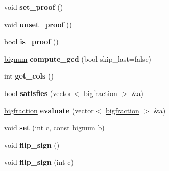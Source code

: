 \begin{DoxyCompactItemize}
\item 
\hypertarget{classEquation_a89987ec22fd6d12148217149076b42bc}{void {\bfseries set\-\_\-proof} ()}\label{classEquation_a89987ec22fd6d12148217149076b42bc}

\item 
\hypertarget{classEquation_af9da212e3e0d5da196c7ae3c981ee925}{void {\bfseries unset\-\_\-proof} ()}\label{classEquation_af9da212e3e0d5da196c7ae3c981ee925}

\item 
\hypertarget{classEquation_a8d8fd4ab3a72786ffbc0bf07153362ca}{bool {\bfseries is\-\_\-proof} ()}\label{classEquation_a8d8fd4ab3a72786ffbc0bf07153362ca}

\item 
\hypertarget{classEquation_a6fce9da19cf98288f3150279bd4c8e17}{\hyperlink{classbignum}{bignum} {\bfseries compute\-\_\-gcd} (bool skip\-\_\-last=false)}\label{classEquation_a6fce9da19cf98288f3150279bd4c8e17}

\item 
\hypertarget{classEquation_aa2b2811df7e0996d5432b30952a4ea79}{int {\bfseries get\-\_\-cols} ()}\label{classEquation_aa2b2811df7e0996d5432b30952a4ea79}

\item 
\hypertarget{classEquation_a3df4ed00b73ec516c53c86f379bf9c9c}{bool {\bfseries satisfies} (vector$<$ \hyperlink{classbigfraction}{bigfraction} $>$ \&a)}\label{classEquation_a3df4ed00b73ec516c53c86f379bf9c9c}

\item 
\hypertarget{classEquation_ae40ffbd2ba1d58b21b0d633ff593b422}{\hyperlink{classbigfraction}{bigfraction} {\bfseries evaluate} (vector$<$ \hyperlink{classbigfraction}{bigfraction} $>$ \&a)}\label{classEquation_ae40ffbd2ba1d58b21b0d633ff593b422}

\item 
\hypertarget{classEquation_a8a01e94de09a9e9ad0afe02b68780090}{void {\bfseries set} (int c, const \hyperlink{classbignum}{bignum} b)}\label{classEquation_a8a01e94de09a9e9ad0afe02b68780090}

\item 
\hypertarget{classEquation_a2ccd7f85ee2504faf9aa99b103c91ab8}{void {\bfseries flip\-\_\-sign} ()}\label{classEquation_a2ccd7f85ee2504faf9aa99b103c91ab8}

\item 
\hypertarget{classEquation_abda0dfa8da838efdf6ebb688d9181b58}{void {\bfseries flip\-\_\-sign} (int c)}\label{classEquation_abda0dfa8da838efdf6ebb688d9181b58}


\end{DoxyCompactItemize}
